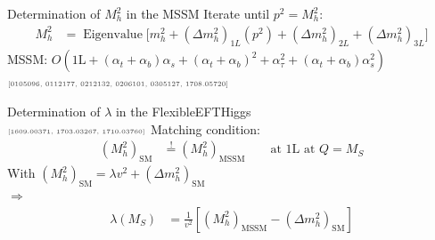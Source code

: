 \documentclass[hyperref={pdfpagelabels=false},ngerman]{beamer}
\newcommand{\MS}{\ensuremath{M_S}}
\newcommand{\mycite}[1]{\ensuremath{\text{\textcolor{darkgray}{\tiny [#1]}}}}
\newcommand{\SM}{\ensuremath{\text{SM}}}
\newcommand{\MSSM}{\ensuremath{\text{MSSM}}}
\newcommand{\at}{\alpha_t}
\newcommand{\ab}{\alpha_b}
\newcommand{\atau}{\alpha_\tau}
\newcommand{\as}{\alpha_s}
\DeclareMathOperator{\Eigenvalue}{Eigenvalue}
\begin{document}
\begin{frame}[noframenumbering]{Determination of $M_h^2$ in the MSSM}
  Iterate until $p^2 = M_h^2$:
  \begin{align*}
    M_h^2 &= \Eigenvalue\Big[
            m_h^2 + (\Delta m_h^2)_{1L}(p^2)
            + (\Delta m_h^2)_{2L} + (\Delta m_h^2)_{3L}
            \Big]
  \end{align*}
  MSSM: $O(\text{1L} + (\at+\ab)\as + (\at+\ab)^2 + \atau^2 + (\at + \ab)\as^2)$\\
  \hspace{2em} \mycite{0105096, 0112177, 0212132, 0206101, 0305127, 1708.05720}
\end{frame}

\begin{frame}[noframenumbering]{Determination of $\lambda$ in the FlexibleEFTHiggs\\ \mycite{1609.00371, 1703.03267, 1710.03760}}
  Matching condition:
  \begin{align*}
    (M_h^2)_{\SM} &\overset{!}{=} (M_h^2)_{\MSSM} \qquad \text{at 1L at } Q = \MS
  \end{align*}
  With $(M_h^2)_{\SM} = \lambda v^2 + (\Delta m_h^2)_{\SM}$\\
  $\Rightarrow$
  \begin{align*}
    \lambda(\MS) &= \frac{1}{v^2} \left[ (M_h^2)_{\MSSM} - (\Delta m_h^2)_{\SM} \right]
  \end{align*}
\end{frame}
\end{document}
